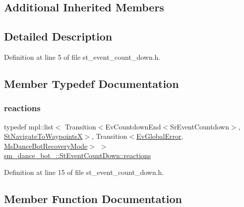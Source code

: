 \subsection*{Additional Inherited Members}


\subsection{Detailed Description}


Definition at line 5 of file st\+\_\+event\+\_\+count\+\_\+down.\+h.



\subsection{Member Typedef Documentation}
\mbox{\label{structsm__dance__bot__2_1_1StEventCountDown_a8131a3f263da41baa539ec07a14a6f5f}} 
\subsubsection{\texorpdfstring{reactions}{reactions}}
{\footnotesize\ttfamily typedef mpl\+::list$<$ Transition$<$Ev\+Countdown\+End$<$Sr\+Event\+Countdown$>$, \hyperlink{structsm__dance__bot__2_1_1StNavigateToWaypointsX}{St\+Navigate\+To\+WaypointsX}$>$, Transition$<$\hyperlink{structsm__dance__bot__2_1_1EvGlobalError}{Ev\+Global\+Error}, \hyperlink{classsm__dance__bot__2_1_1MsDanceBotRecoveryMode}{Ms\+Dance\+Bot\+Recovery\+Mode}$>$ $>$ \hyperlink{structsm__dance__bot__2_1_1StEventCountDown_a8131a3f263da41baa539ec07a14a6f5f}{sm\+\_\+dance\+\_\+bot\+\_\+::\+St\+Event\+Count\+Down\+::reactions}}



Definition at line 15 of file st\+\_\+event\+\_\+count\+\_\+down.\+h.



\subsection{Member Function Documentation}
\mbox{\label{structsm__dance__bot__2_1_1StEventCountDown_af5c378d5ea5e77c6ed3bc5e8870e4bcc}} 
